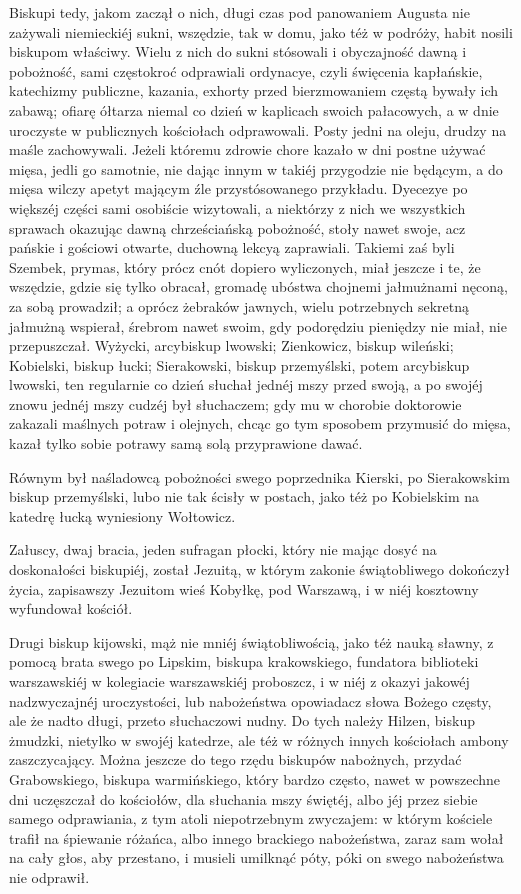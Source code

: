 \documentclass{book}
\begin{document}
Biskupi tedy, jakom zaczął o nich, długi czas pod panowaniem Augusta nie zażywali niemieckiéj sukni, wszędzie, tak w domu, jako téż w podróży, habit nosili biskupom właściwy. Wielu z nich do sukni stósowali i obyczajność dawną i pobożność, sami częstokroć odprawiali ordynacye, czyli święcenia kapłańskie, katechizmy publiczne, kazania, exhorty przed bierzmowaniem częstą bywały ich zabawą; ofiarę ółtarza niemal co dzień w kaplicach swoich pałacowych, a w dnie uroczyste w publicznych kościołach odprawowali. Posty jedni na oleju, drudzy na maśle zachowywali. Jeżeli któremu zdrowie chore kazało w dni postne używać mięsa, jedli go samotnie, nie dając innym w takiéj przygodzie nie będącym, a do mięsa wilczy apetyt mającym źle przystósowanego przykładu. Dyecezye po większéj części sami osobiście wizytowali, a niektórzy z nich we wszystkich sprawach okazując dawną chrześciańską pobożność, stoły nawet swoje, acz pańskie i gościowi otwarte, duchowną lekcyą zaprawiali. Takiemi zaś byli Szembek, prymas, który prócz cnót dopiero wyliczonych, miał jeszcze i te, że wszędzie, gdzie się tylko obracał, gromadę ubóstwa chojnemi jałmużnami nęconą, za sobą prowadził; a oprócz żebraków jawnych, wielu potrzebnych sekretną jałmużną wspierał, śrebrom nawet swoim, gdy podorędziu pieniędzy nie miał, nie przepuszczał. Wyżycki, arcybiskup lwowski; Zienkowicz, biskup wileński; Kobielski, biskup łucki; Sierakowski, biskup przemyślski, potem arcybiskup lwowski, ten regularnie co dzień słuchał jednéj mszy przed swoją, a po swojéj znowu jednéj mszy cudzéj był słuchaczem; gdy mu w chorobie doktorowie zakazali maślnych potraw i olejnych, chcąc go tym sposobem przymusić do mięsa, kazał tylko sobie potrawy samą solą przyprawione dawać.

Równym był naśladowcą pobożności swego poprzednika Kierski, po Sierakowskim biskup przemyślski, lubo nie tak ścisły w postach, jako téż po Kobielskim na katedrę łucką wyniesiony Wołtowicz.

Załuscy, dwaj bracia, jeden sufragan płocki, który nie mając dosyć na doskonałości biskupiéj, został Jezuitą, w którym zakonie świątobliwego dokończył życia, zapisawszy Jezuitom wieś Kobyłkę, pod Warszawą, i w niéj kosztowny wyfundował kościół.

Drugi biskup kijowski, mąż nie mniéj świątobliwością, jako téż nauką sławny, z pomocą brata swego po Lipskim, biskupa krakowskiego, fundatora biblioteki warszawskiéj w kolegiacie warszawskiéj proboszcz, i w niéj z okazyi jakowéj nadzwyczajnéj uroczystości, lub nabożeństwa opowiadacz słowa Bożego częsty, ale że nadto długi, przeto słuchaczowi nudny. Do tych należy Hilzen, biskup żmudzki, nietylko w swojéj katedrze, ale téż w różnych innych kościołach ambony zaszczycający. Można jeszcze do tego rzędu biskupów nabożnych, przydać Grabowskiego, biskupa warmińskiego, który bardzo często, nawet w powszechne dni uczęszczał do kościołów, dla słuchania mszy świętéj, albo jéj przez siebie samego odprawiania, z tym atoli niepotrzebnym zwyczajem: w którym kościele trafił na śpiewanie różańca, albo innego brackiego nabożeństwa, zaraz sam wołał na cały głos, aby przestano, i musieli umilknąć póty, póki on swego nabożeństwa nie odprawił.
\end{document}
